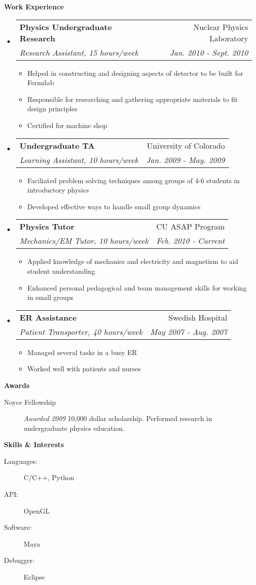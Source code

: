 \documentclass[letterpaper,11pt]{article}
\makeatletter
\newcommand{\resitem}[1]{\item #1 \vspace{-2pt}}
\newcommand{\resheading}[1]{{\large
\colorbox{mygrey}{\begin{minipage}{\textwidth}{\textbf{#1
\vphantom{p\^{E}}}}\end{minipage}}}}
\newcommand{\ressubheading}[4]{
\begin{tabular*}{7.0in}{l@{\extracolsep{\fill}}r}
               \textbf{#1} & #2 \\
               \textit{#3} & \textit{#4} \\
\end{tabular*}\vspace{-6pt}}
\makeatother
\begin{document}
\resheading{Work Experience}
\begin{itemize}
\item
       \ressubheading{Physics Undergraduate Research}{Nuclear Physics Laboratory}{Research Assistant, 15 hours/week}{Jan. 2010 - Sept. 2010}
       \begin{itemize}
               \resitem{Helped in constructing and designing aspects of detector to be built for Fermilab}
               \resitem{Responsible for researching and gathering appropriate materials to fit design principles}
               \resitem{Certified for machine shop}
       \end{itemize}

\item
       \ressubheading{Undergraduate TA}{University of Colorado}{Learning Assistant, 10 hours/week}{Jan. 2009 - May. 2009}
       \begin{itemize}
               \resitem{Faciliated problem solving techniques among groups of 4-6 students in introductory physics}
               \resitem{Developed effective ways to handle small group dynamics}
       \end{itemize}

\item
       \ressubheading{Physics Tutor}{CU ASAP Program}{Mechanics/EM Tutor, 10 hours/week}{Feb. 2010 - Current}
       \begin{itemize}
               \resitem{Applied knowledge of mechanics and electricity and magnetism to aid student understanding}
               \resitem{Enhanced personal pedagogical and team management skills for working in small groups}
       \end{itemize}

\item
       \ressubheading{ER Assistance}{Swedish Hospital}{Patient Transporter, 40 hours/week}{May 2007 - Aug. 2007}
       \begin{itemize}
               \resitem{Managed several tasks in a busy ER}
               \resitem{Worked well with patients and nurses}
       \end{itemize}
\end{itemize}

\resheading{Awards}

\begin{description}
\item[Noyce Fellowship] \emph{Awarded 2009} 10,000 dollar scholarship. Performed research in undergraduate physics education.

\end{description}

\resheading{Skills \& Interests}

\begin{description}
\item[Languages:] C/C++, Python
\item[API:] OpenGL
\item[Software:] Maya
\item[Debugger:] Eclipse
\end{description}
\end{document}
